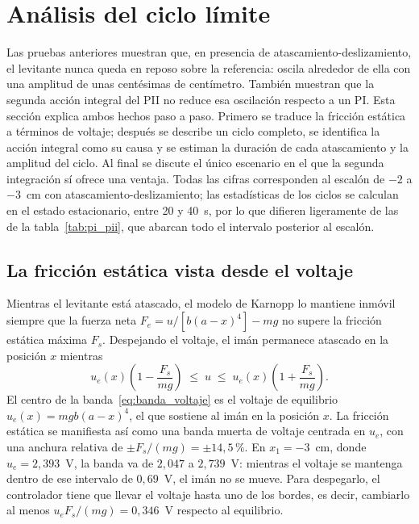 \section{Análisis del ciclo límite}
\label{sec:analisis_ciclo}

Las pruebas anteriores muestran que, en presencia de atascamiento-deslizamiento, el levitante nunca queda en reposo sobre la referencia: oscila alrededor de ella con una amplitud de unas centésimas de centímetro. También muestran que la segunda acción integral del PII no reduce esa oscilación respecto a un PI. Esta sección explica ambos hechos paso a paso. Primero se traduce la fricción estática a términos de voltaje; después se describe un ciclo completo, se identifica la acción integral como su causa y se estiman la duración de cada atascamiento y la amplitud del ciclo. Al final se discute el único escenario en el que la segunda integración sí ofrece una ventaja. Todas las cifras corresponden al escalón de $-2$ a $-3$~cm con atascamiento-deslizamiento; las estadísticas de los ciclos se calculan en el estado estacionario, entre 20 y 40~s, por lo que difieren ligeramente de las de la tabla~\ref{tab:pi_pii}, que abarcan todo el intervalo posterior al escalón.

\subsection{La fricción estática vista desde el voltaje}

Mientras el levitante está atascado, el modelo de Karnopp lo mantiene inmóvil siempre que la fuerza neta $F_e = u/[b(a-x)^4] - mg$ no supere la fricción estática máxima $F_s$. Despejando el voltaje, el imán permanece atascado en la posición $x$ mientras
\begin{equation}
u_e(x)\left(1-\frac{F_s}{mg}\right) \;\le\; u \;\le\; u_e(x)\left(1+\frac{F_s}{mg}\right) .
\label{eq:banda_voltaje}
\end{equation}
El centro de la banda~\eqref{eq:banda_voltaje} es el voltaje de equilibrio $u_e(x)=mgb(a-x)^4$, el que sostiene al imán en la posición $x$. La fricción estática se manifiesta así como una banda muerta de voltaje centrada en $u_e$, con una anchura relativa de $\pm F_s/(mg)=\pm14{,}5$\,\%. En $x_1=-3$~cm, donde $u_e=2{,}393$~V, la banda va de $2{,}047$ a $2{,}739$~V: mientras el voltaje se mantenga dentro de ese intervalo de $0{,}69$~V, el imán no se mueve. Para despegarlo, el controlador tiene que llevar el voltaje hasta uno de los bordes, es decir, cambiarlo al menos $u_e F_s/(mg)=0{,}346$~V respecto al equilibrio.

